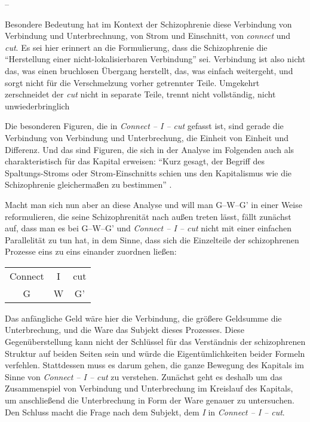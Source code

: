 \documentclass[12pt,
               DIV13,
               paper=a4,
               twoside=false,
               onehalfspacing,
               bibliography=totoc,
               toc=graduated,
               draft,
               ]{scrartcl}
\newcommand{\pc}[2]{\parencite[#1]{#2}}
\newcommand{\worries}[1]{\ifdraft{\textcolor{blue}{\texttt{(#1)}}}{}}
\newcommand{\gwg}{G--W--G'\xspace}
\newcommand{\cic}{Connect -- I -- cut\xspace}
\begin{document}
--

Besondere Bedeutung hat im Kontext der Schizophrenie diese Verbindung
von Verbindung und Unterbrechnung, von Strom und Einschnitt, von
\emph{connect} und \emph{cut}. Es sei hier erinnert an die
Formulierung, dass die Schizophrenie die "`Herstellung einer
nicht-lokalisierbaren Verbindung"' \pc{19}{schizg} sei. Verbindung ist
also nicht das, was einen bruchlosen Übergang herstellt, das, was
einfach weitergeht, und sorgt nicht für die Verschmelzung vorher
getrennter Teile. Umgekehrt zerschneidet der \emph{cut} nicht in
separate Teile, trennt nicht vollständig, nicht unwiederbringlich

Die besonderen Figuren, die in \emph{\cic} gefasst ist, sind gerade
die Verbindung von Verbindung und Unterbrechung, die Einheit von
Einheit und Differenz. Und das sind Figuren, die sich in der Analyse
im Folgenden auch als charakteristisch für das Kapital erweisen:
"`Kurz gesagt, der Begriff des Spaltungs-Stroms oder Strom-Einschnitts
schien uns den Kapitalismus wie die Schizophrenie gleichermaßen zu
bestimmen"' \pc{317}{ao}.



Macht man sich nun aber an diese Analyse und will man \gwg in einer
Weise reformulieren, die seine Schizophrenität nach außen treten
lässt, fällt zunächst auf, dass man es bei \gwg und \emph{\cic} nicht
mit einer einfachen Parallelität zu tun hat, in dem Sinne, dass sich
die Einzelteile der schizophrenen Prozesse eins zu eins einander
zuordnen ließen:

{\centering\hfill
\begin{tabular}{c@{ -- }c@{ -- }c}
Connect & I & cut\\
G & W & G'
\end{tabular}
\hfill}

Das anfängliche Geld wäre hier die Verbindung, die größere Geldsumme
die Unterbrechung, und die Ware das Subjekt dieses Prozesses. Diese
Gegenüberstellung kann nicht der Schlüssel für das Verständnis der
schizophrenen Struktur auf beiden Seiten sein und würde die
Eigentümlichkeiten beider Formeln verfehlen. Stattdessen muss es darum
gehen, die ganze Bewegung des Kapitals im Sinne von \emph{\cic} zu
verstehen. Zunächst geht es deshalb um das Zusammenspiel von
Verbindung und Unterbrechung im Kreislauf des Kapitals, um
anschließend die Unterbrechung in Form der Ware genauer zu
untersuchen. Den Schluss macht die Frage nach dem Subjekt, dem
\emph{I} in \emph{\cic}.
\end{document}
